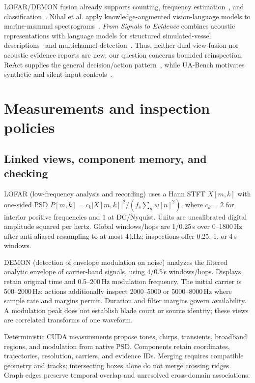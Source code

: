 \documentclass[runningheads,orivec]{llncs}
\begin{document}
LOFAR/DEMON fusion already supports counting, frequency estimation~\cite{li2022lofar}, and classification~\cite{najamuddin2026fusion}. Nihal et al. apply knowledge-augmented vision-language models to marine-mammal spectrograms~\cite{nihal2025knowledge}. \emph{From Signals to Evidence} combines acoustic representations with language models for structured simulated-vessel descriptions~\cite{zhang2026evidence1} and multichannel detection~\cite{li2026evidence2}. Thus, neither dual-view fusion nor acoustic evidence reports are new; our question concerns bounded reinspection. ReAct supplies the general decision/action pattern~\cite{yao2023react}, while UA-Bench motivates synthetic and silent-input controls~\cite{sun2026uabench}.

\section{Measurements and inspection policies}
\subsection{Linked views, component memory, and checking}
LOFAR (low-frequency analysis and recording) uses a Hann STFT $X[m,k]$ with one-sided PSD $P[m,k]=c_k|X[m,k]|^2/(f_s\sum_nw[n]^2)$, where $c_k=2$ for interior positive frequencies and 1 at DC/Nyquist. Units are uncalibrated digital amplitude squared per hertz. Global windows/hops are 1/0.25\,s over 0--1800\,Hz after anti-aliased resampling to at most 4\,kHz; inspections offer 0.25, 1, or 4\,s windows.

DEMON (detection of envelope modulation on noise) analyzes the filtered analytic envelope of carrier-band signals, using 4/0.5\,s windows/hops. Displays retain original time and 0.5--200\,Hz modulation frequency. The initial carrier is 500--2000\,Hz; actions additionally inspect 2000--5000 or 5000--8000\,Hz where sample rate and margins permit. Duration and filter margins govern availability. A modulation peak does not establish blade count or source identity; these views are correlated transforms of one waveform.

Deterministic CUDA measurements propose tones, chirps, transients, broadband regions, and modulation from native PSD. Components retain coordinates, trajectories, resolution, carriers, and evidence IDs. Merging requires compatible geometry and tracks; intersecting boxes alone do not merge crossing ridges. Graph edges preserve temporal overlap and unresolved cross-domain associations.
\end{document}

